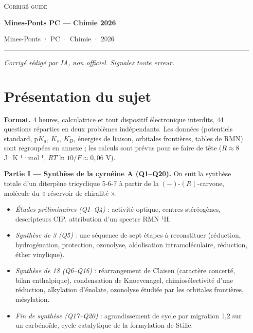 \documentclass[11pt,a4paper]{article}
\providecommand{\tightlist}{\setlength{\itemsep}{0pt}\setlength{\parskip}{0pt}}
\begin{document}
\thispagestyle{plain}
\begin{center}
  {\small\scshape Corrigé guidé}\par\smallskip
  {\LARGE\bfseries Mines-Ponts PC — Chimie 2026\par}\medskip
  {\large Mines-Ponts · PC · Chimie · 2026\par}
\end{center}
\vspace{2pt}\hrule\vspace{8pt}

\emph{Corrigé rédigé par IA, non officiel. Signalez toute erreur.}

\hypertarget{pruxe9sentation-du-sujet}{%
\section{Présentation du sujet}\label{pruxe9sentation-du-sujet}}

\textbf{Format.} 4 heures, calculatrice et tout dispositif électronique interdits, 44 questions réparties en deux problèmes indépendants. Les données (potentiels standard, p\(K_a\), \(K_s\), \(K_D^\circ\), énergies de liaison, orbitales frontières, tables de RMN) sont regroupées en annexe ; les calculs sont prévus pour se faire de tête (\(R\approx8\) J·K⁻¹·mol⁻¹, \(RT\ln10/F\approx0{,}06\) V).

\textbf{Partie I --- Synthèse de la cyrnéine A (Q1--Q20).} On suit la synthèse totale d'un diterpène tricyclique 5-6-7 à partir de la \((-)\)-\((R)\)-carvone, molécule du « réservoir de chiralité ».

\begin{itemize}
\tightlist
\item
  \emph{Études préliminaires (Q1--Q4)} : activité optique, centres stéréogènes, descripteurs CIP, attribution d'un spectre RMN ¹H.
\item
  \emph{Synthèse de 3 (Q5)} : une séquence de sept étapes à reconstituer (réduction, hydrogénation, protection, ozonolyse, aldolisation intramoléculaire, réduction, éther vinylique).
\item
  \emph{Synthèse de 18 (Q6--Q16)} : réarrangement de Claisen (caractère concerté, bilan enthalpique), condensation de Knoevenagel, chimiosélectivité d'une réduction, alkylation d'énolate, ozonolyse étudiée par les orbitales frontières, mésylation.
\item
  \emph{Fin de synthèse (Q17--Q20)} : agrandissement de cycle par migration 1,2 sur un carbénoïde, cycle catalytique de la formylation de Stille.
\end{itemize}
\end{document}
